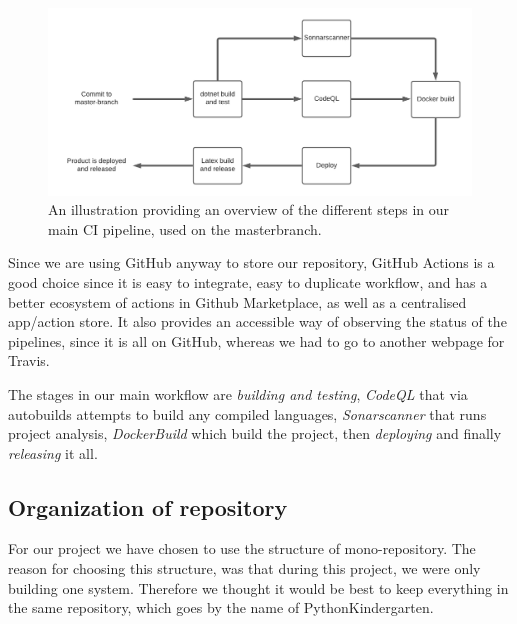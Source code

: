 \begin{figure}[h!]
    \centering
    \includegraphics[scale=0.7]{images/CIpipelinediagram.png}
    \caption{An illustration providing an overview of the different steps in our main CI pipeline, used on the masterbranch. }
\end{figure}

Since we are using GitHub anyway to store our repository, GitHub Actions is a good choice since it is easy to 
integrate, easy to duplicate workflow, and has a better ecosystem of actions in Github Marketplace, as well as a centralised app/action store. 
It also provides an accessible way of observing the status of the pipelines, since it is all on GitHub, whereas we had to go to another webpage for Travis.  

The stages in our main workflow are \textit{building and testing}, \textit{CodeQL} that via autobuilds attempts to build any compiled languages, \textit{Sonarscanner} that runs project analysis, \textit{DockerBuild} which build the project, then \textit{deploying} and finally \textit{releasing} it all.\newline

\subsection{Organization of repository} %
For our project we have chosen to use the structure of mono-repository. 
The reason for choosing this structure, was that during this project, we were only building one system. 
Therefore we thought it would be best to keep everything in the same repository, which goes by the name of PythonKindergarten. \newline
  
  
